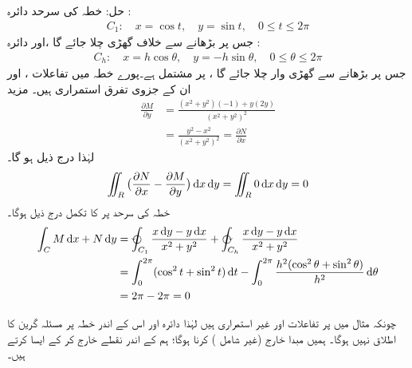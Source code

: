  حل:\quad
 خطہ   کی سرحد دائرہ :
\begin{align*}
 C_1:\quad  x=\cos t,\quad  y= \sin t,\quad 0\leq t \leq 2\pi 
\end{align*}
   جس پر    بڑھانے سے خلاف گھڑی چلا جائے گا ،اور دائرہ :
\begin{align*}
  C_h:\quad  x=h\cos \theta,\quad  y= -h\sin\theta,\quad 0\leq \theta \leq 2\pi  
\end{align*}
جس پر    بڑھانے سے گھڑی وار چلا جائے گا ، پر مشتمل ہے۔پورے  خطہ  میں تفاعلات   ،   اور ان کے جزوی تفرق استمراری ہیں۔ مزید  
\begin{align*}
     \frac{\partial M}{\partial y} &= \frac{(x^2 + y^2)(-1) + y(2y)}{(x^2 + y^2)^2} \\     &= \frac{y^2 - x^2}{(x^2 + y^2)^2} = \frac{\partial N}{\partial x} 
\end{align*}
  لہٰذا  درج ذیل ہو گا۔
\begin{align*}
     \iint_R \big(\frac{\partial N}{\partial x} - \frac{\partial M}{\partial y}\big) \dif x \dif y = \iint_R 0 \dif x \dif y =0  
\end{align*}
 خطہ  کی سرحد پر   کا  تکمل  درج ذیل ہوگا۔ 
\begin{align*}
 \int_C M \dif x + N \dif y &= \varointctrclockwise_{C_1} \frac{x \dif y - y \dif x}{x^2 + y^2} + \varointclockwise_{C_h}  \frac{x \dif y - y \dif x}{x^2 + y^2} \\ 
 &= \int_0^{2\pi} (\cos^2{t} + \sin^2{t}) \dif t - \int_0^{2\pi} \frac{h^2 (\cos^2{\theta} + \sin^2{\theta})}{h^2} \dif \theta\\
  &= 2\pi - 2\pi =0  
\end{align*}

چونکہ مثال      میں  پر تفاعلات  اور   غیر استمراری ہیں لہٰذا دائرہ   اور اس کے اندر خطہ پر مسئلہ گرین کا اطلاق نہیں ہوگا۔ ہمیں  مبدا   خارج (غیر شامل ) کرنا ہوگا؛ ہم   کے اندر نقطے  خارج کر کے ایسا کرتے ہیں۔

